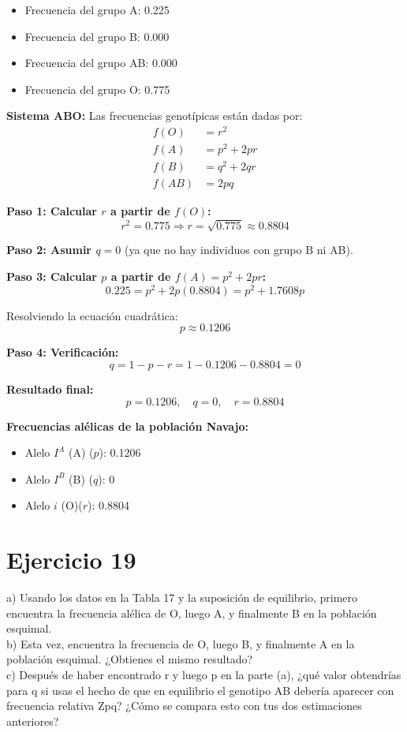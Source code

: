 \documentclass{article}
\begin{document}
\begin{itemize}
    \item Frecuencia del grupo A: 0.225
    \item Frecuencia del grupo B: 0.000
    \item Frecuencia del grupo AB: 0.000
    \item Frecuencia del grupo O: 0.775
\end{itemize}

\textbf{Sistema ABO:} Las frecuencias genotípicas están dadas por:
\[
\begin{aligned}
f(O) &= r^2 \\
f(A) &= p^2 + 2pr \\
f(B) &= q^2 + 2qr \\
f(AB) &= 2pq
\end{aligned}
\]

\textbf{Paso 1: Calcular $r$ a partir de $f(O)$:}
\[
r^2 = 0.775 \Rightarrow r = \sqrt{0.775} \approx 0.8804
\]

\textbf{Paso 2: Asumir $q = 0$} (ya que no hay individuos con grupo B ni AB).

\textbf{Paso 3: Calcular $p$ a partir de $f(A) = p^2 + 2pr$:}
\[
0.225 = p^2 + 2p(0.8804) = p^2 + 1.7608p
\]

Resolviendo la ecuación cuadrática:
\[
p \approx 0.1206
\]

\textbf{Paso 4: Verificación:}
\[
q = 1 - p - r = 1 - 0.1206 - 0.8804 = 0
\]

\textbf{Resultado final:}
\[
\boxed{p = 0.1206, \quad q = 0, \quad r = 0.8804}
\]

\textbf{Frecuencias alélicas de la población Navajo:}

\begin{itemize}
    \item Alelo $I^A$ (A) ($p$): 0.1206
    \item Alelo $I^B$ (B) ($q$): 0
    \item Alelo $i$ (O)($r$): 0.8804
\end{itemize}

\section{Ejercicio 19}
a) Usando los datos en la Tabla 17 y la suposición de equilibrio, primero encuentra la frecuencia alélica de O, luego A, y finalmente B en la población esquimal.\\
b) Esta vez, encuentra la frecuencia de O, luego B, y finalmente A en la población esquimal. ¿Obtienes el mismo resultado?\\
c) Después de haber encontrado r y luego p en la parte (a), ¿qué valor obtendrías para q si usas el hecho de que en equilibrio el genotipo AB debería aparecer con frecuencia relativa Zpq? ¿Cómo se compara esto con tus dos estimaciones anteriores?\\
\end{document}
